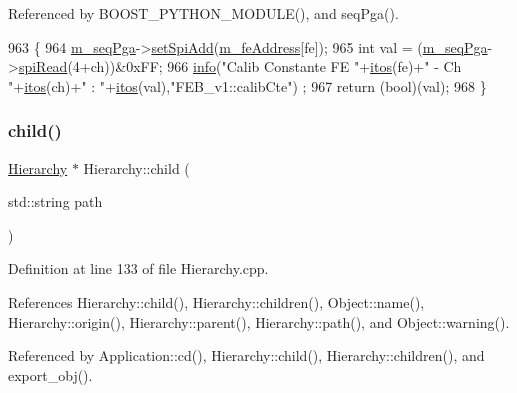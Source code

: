 Referenced by B\+O\+O\+S\+T\+\_\+\+P\+Y\+T\+H\+O\+N\+\_\+\+M\+O\+D\+U\+L\+E(), and seq\+Pga().


\begin{DoxyCode}
963                                      \{
964   \hyperlink{classFEB__v1_a6c7804ac86796f233a8393043adf2e77}{m\_seqPga}->\hyperlink{classSeqPGA_ac998ce3a6d9b5f2e88cc8393f8c1df53}{setSpiAdd}(\hyperlink{classFEB__v1_a4e1945c2d5b434125f375e9d0fc6d99f}{m\_feAddress}[fe]);
965   \textcolor{keywordtype}{int} val = (\hyperlink{classFEB__v1_a6c7804ac86796f233a8393043adf2e77}{m\_seqPga}->\hyperlink{classSeqPGA_ab3d0e5e5d4014bc7a92588a76b8713d4}{spiRead}(4+ch))&0xFF;
966   \hyperlink{classObject_a644fd329ea4cb85f54fa6846484b84a8}{info}(\textcolor{stringliteral}{"Calib Constante FE "}+\hyperlink{Tools_8h_af330027dbdafb9a30768b3613c553e60}{itos}(fe)+\textcolor{stringliteral}{" - Ch "}+\hyperlink{Tools_8h_af330027dbdafb9a30768b3613c553e60}{itos}(ch)+\textcolor{stringliteral}{" : "}+\hyperlink{Tools_8h_af330027dbdafb9a30768b3613c553e60}{itos}(val),\textcolor{stringliteral}{"FEB\_v1::calibCte"})
      ;
967   \textcolor{keywordflow}{return} (\textcolor{keywordtype}{bool})(val);
968 \}
\end{DoxyCode}
\mbox{\label{classHierarchy_a1e207f973c694b538bf90107b4868817}} 
\subsubsection{\texorpdfstring{child()}{child()}}
{\footnotesize\ttfamily \hyperlink{classHierarchy}{Hierarchy} $\ast$ Hierarchy\+::child (\begin{DoxyParamCaption}\item[{std\+::string}]{path }\end{DoxyParamCaption})\hspace{0.3cm}{\ttfamily [inherited]}}



Definition at line 133 of file Hierarchy.\+cpp.



References Hierarchy\+::child(), Hierarchy\+::children(), Object\+::name(), Hierarchy\+::origin(), Hierarchy\+::parent(), Hierarchy\+::path(), and Object\+::warning().



Referenced by Application\+::cd(), Hierarchy\+::child(), Hierarchy\+::children(), and export\+\_\+obj().


